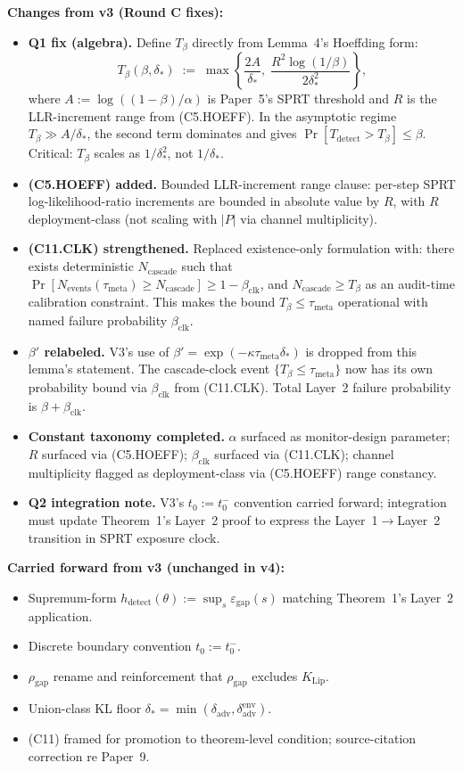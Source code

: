 \documentclass{article}
\newcommand{\deltaadv}{\delta_{\mathrm{adv}}}
\newcommand{\deltastar}{\delta_{*}}
\newcommand{\rhogap}{\rho_{\mathrm{gap}}}
\newcommand{\epsgap}{\varepsilon_{\mathrm{gap}}}
\newcommand{\Tbeta}{T_{\beta}}
\newcommand{\Ncasc}{N_{\mathrm{cascade}}}
\newcommand{\Nev}{N_{\mathrm{events}}}
\newcommand{\bclk}{\beta_{\mathrm{clk}}}
\begin{document}
\textbf{Changes from v3 (Round C fixes):}

\begin{itemize}
\item \textbf{Q1 fix (algebra).}  Define $\Tbeta$ directly from
  Lemma~4's Hoeffding form:
  \[
    \Tbeta(\beta, \deltastar) \;:=\;
    \max\!\left\{\frac{2A}{\deltastar},\;
    \frac{R^2 \log(1/\beta)}{2 \deltastar^2}\right\},
  \]
  where $A := \log((1-\beta)/\alpha)$ is Paper~5's SPRT threshold
  and $R$ is the LLR-increment range from (C5.HOEFF).  In the
  asymptotic regime $\Tbeta \gg A/\deltastar$, the second term
  dominates and gives $\Pr[T_{\mathrm{detect}} > \Tbeta] \leq
  \beta$.  Critical: $\Tbeta$ scales as $1/\deltastar^2$, not
  $1/\deltastar$.
\item \textbf{(C5.HOEFF) added.}  Bounded LLR-increment range
  clause: per-step SPRT log-likelihood-ratio increments are bounded
  in absolute value by $R$, with $R$ deployment-class (not scaling
  with $|P|$ via channel multiplicity).
\item \textbf{(C11.CLK) strengthened.}  Replaced existence-only
  formulation with: there exists deterministic $\Ncasc$ such that
  $\Pr[\Nev(\tau_{\mathrm{meta}}) \geq \Ncasc] \geq 1 - \bclk$, and
  $\Ncasc \geq \Tbeta$ as an audit-time calibration constraint.
  This makes the bound $\Tbeta \leq \tau_{\mathrm{meta}}$
  operational with named failure probability $\bclk$.
\item \textbf{$\beta'$ relabeled.}  V3's use of $\beta' = \exp(-\kappa
  \tau_{\mathrm{meta}} \deltastar)$ is dropped from this lemma's
  statement.  The cascade-clock event $\{\Tbeta \leq
  \tau_{\mathrm{meta}}\}$ now has its own probability bound via
  $\bclk$ from (C11.CLK).  Total Layer~2 failure probability is
  $\beta + \bclk$.
\item \textbf{Constant taxonomy completed.}  $\alpha$ surfaced as
  monitor-design parameter; $R$ surfaced via (C5.HOEFF); $\bclk$
  surfaced via (C11.CLK); channel multiplicity flagged as
  deployment-class via (C5.HOEFF) range constancy.
\item \textbf{Q2 integration note.}  V3's $t_0 := t_0^-$ convention
  carried forward; integration must update Theorem~1's Layer~2
  proof to express the Layer~1$\to$Layer~2 transition in SPRT
  exposure clock.
\end{itemize}

\textbf{Carried forward from v3 (unchanged in v4):}
\begin{itemize}
\item Supremum-form $h_{\mathrm{detect}}(\theta) := \sup_s
  \epsgap(s)$ matching Theorem~1's Layer~2 application.
\item Discrete boundary convention $t_0 := t_0^-$.
\item $\rhogap$ rename and reinforcement that $\rhogap$ excludes
  $K_{\mathrm{Lip}}$.
\item Union-class KL floor $\deltastar = \min(\deltaadv,
  \delta_{\mathrm{adv}}^{\mathrm{env}})$.
\item (C11) framed for promotion to theorem-level condition;
  source-citation correction re Paper~9.
\end{itemize}
\end{document}
